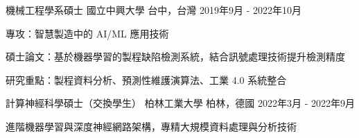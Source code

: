 
\begin{cventries}
  \cventry
    {機械工程學系碩士} %
    {國立中興大學} %
    {台中，台灣} %
    {2019年9月 - 2022年10月} %
    {
      \begin{cvitems}
        \item {專攻：智慧製造中的 AI/ML 應用技術}
        \item {碩士論文：基於機器學習的製程缺陷檢測系統，結合訊號處理技術提升檢測精度}
        \item {研究重點：製程資料分析、預測性維護演算法、工業 4.0 系統整合}
      \end{cvitems}
    }
    
  \vspace{2mm} %
  
  \cventry
    {計算神經科學碩士（交換學生）} %
    {柏林工業大學} %
    {柏林，德國} %
    {2022年3月 - 2022年9月} %
    {
      \begin{cvitems}
        \item {進階機器學習與深度神經網路架構，專精大規模資料處理與分析技術}
      \end{cvitems}
    }
    
\end{cventries}